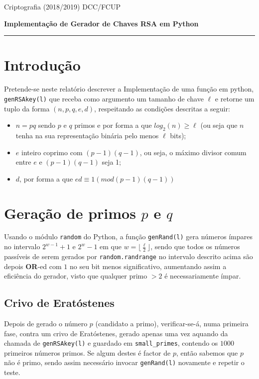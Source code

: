 \documentclass[dvipsnames]{article}
\begin{document}
\noindent Criptografia (2018/2019)
\hfill DCC/FCUP

\begin{center}\LARGE\bf 
  Implementação de Gerador de Chaves RSA em Python \\
\end{center}

\vskip 0.4cm
\hrule
\vskip 0.4cm

\begin{multicols}{2}
  \section{Introdução}
  Pretende-se neste relatório descrever a Implementação de uma função em python, \texttt{genRSAkey(l)} que receba como argumento um tamanho de chave $\ell$ e retorne um tuplo da forma $(n,p,q,e,d)$, respeitando as condições descritas a seguir:
  \begin{itemize}
    \item $n=pq$ sendo $p$ e $q$ primos e por forma a que $log_2(n) \geq \ell$ (ou seja que $n$ tenha na sua representação binária pelo menos $\ell$ bits);
    \item $e$ inteiro coprimo com $(p-1)(q-1)$, ou seja, o máximo divisor comum entre $e$ e $(p-1)(q-1)$ seja 1;
    \item $d$, por forma a que $ed \equiv 1 (mod (p-1)(q-1))$
  \end{itemize}
  
  \section{Geração de primos $p$ e $q$}
  Usando o módulo \texttt{random} do Python, a função \texttt{genRand(l)} gera números ímpares no intervalo $2^{w-1} + 1$ e $2^{w} - 1$ em que $w=\lfloor \frac{\ell}{2} \rfloor$, sendo que todos os números passíveis de serem gerados por \texttt{random.randrange} no intervalo descrito acima são depois \textbf{OR}-ed com $1$ no seu bit menos significativo, aumentando assim a eficiência do gerador, visto que qualquer primo $>2$ é necessariamente ímpar.
  
  \vskip 0.4cm
  
  \subsection{Crivo de Eratóstenes}
  
  Depois de gerado o número $p$ (candidato a primo), verificar-se-á, numa primeira fase, contra um crivo de Eratóstenes, gerado apenas uma vez aquando da chamada de \texttt{genRSAkey(l)} e guardado em \texttt{small\_primes}, contendo os $1000$ primeiros números primos. Se algum destes é factor de $p$, então sabemos que $p$ não é primo, sendo assim necessário invocar \texttt{genRand(l)} novamente e repetir o teste.
  

\end{multicols}
\end{document}
